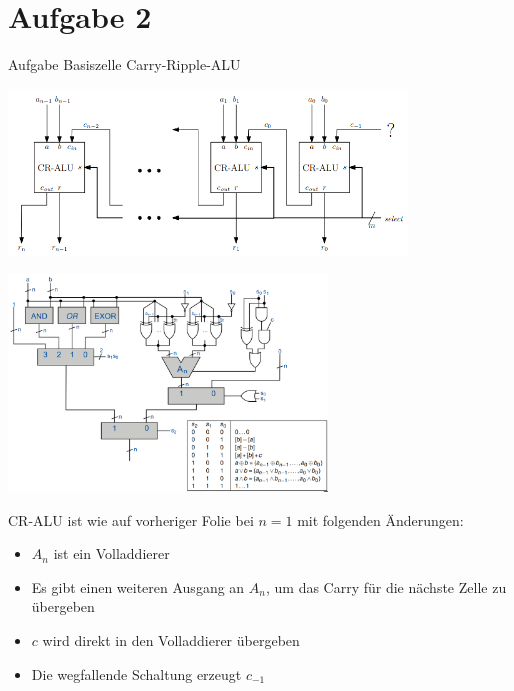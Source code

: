 
\section{Aufgabe 2}

\setcounter{exercise}{1}

\begin{frame}[allowframebreaks]{Aufgabe \thesection}{Basiszelle Carry-Ripple-ALU}

\begin{exercisenoinc}
    \center\includegraphics[width=300pt]{figures/CR-ALU.png}
\end{exercisenoinc}

\begin{requirementsnoinc}
    \center\includegraphics[width=240pt]{figures/ALU_logic.png}
\end{requirementsnoinc}

\begin{solutionnoinc}
CR-ALU ist wie auf vorheriger Folie bei $n=1$ mit folgenden Änderungen:
    \begin{itemize}
        \item $A_n$ ist ein Volladdierer
        \item Es gibt einen weiteren Ausgang an $A_n$, um das Carry für die nächste Zelle zu übergeben
        \item $c$ wird direkt in den Volladdierer übergeben
        \item Die wegfallende Schaltung erzeugt $c_{-1}$
    \end{itemize}
\end{solutionnoinc}


\end{frame}
